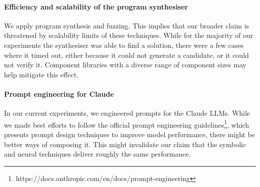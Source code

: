 \documentclass[sigconf,review,anonymous]{acmart}
\begin{document}
\paragraph{Efficiency and scalability of the program synthesiser}
%
We apply program synthesis and fuzzing.  This implies that our broader claim
is threatened by scalability limits of these techniques.  While for the
majority of our experiments the synthesiser was able to find a solution,
there were a few cases where it timed out, either because it could not
generate a candidate, or it could not verify it.  Component libraries with a
diverse range of component sizes may help mitigate this effect.

\paragraph{Prompt engineering for Claude}
%
In our current experiments, we engineered prompts for the Claude LLMs. 
While we made best efforts to follow the official prompt engineering
guidelines\footnote{https://docs.anthropic.com/en/docs/prompt-engineering},
which presents prompt design techniques to improve model performance, there
might be better ways of composing it.  This might invalidate our claim that
the symbolic and neural techniques deliver roughly the same performance.

%



\end{document}
